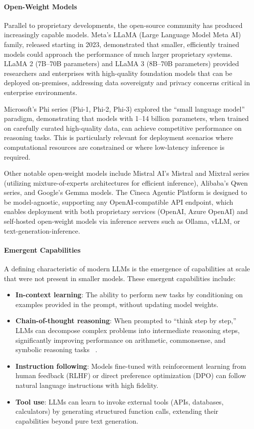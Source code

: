 \documentclass[a4paper,twoside]{sapthesis}
\begin{document}
\paragraph{Open-Weight Models}
Parallel to proprietary developments, the open-source community has produced increasingly capable models. Meta's LLaMA (Large Language Model Meta AI) family, released starting in 2023, demonstrated that smaller, efficiently trained models could approach the performance of much larger proprietary systems. LLaMA 2 (7B--70B parameters) and LLaMA 3 (8B--70B parameters) provided researchers and enterprises with high-quality foundation models that can be deployed on-premises, addressing data sovereignty and privacy concerns critical in enterprise environments.

Microsoft's Phi series (Phi-1, Phi-2, Phi-3) explored the ``small language model'' paradigm, demonstrating that models with 1--14 billion parameters, when trained on carefully curated high-quality data, can achieve competitive performance on reasoning tasks. This is particularly relevant for deployment scenarios where computational resources are constrained or where low-latency inference is required.

Other notable open-weight models include Mistral AI's Mistral and Mixtral series (utilizing mixture-of-experts architectures for efficient inference), Alibaba's Qwen series, and Google's Gemma models. The Cineca Agentic Platform is designed to be model-agnostic, supporting any OpenAI-compatible API endpoint, which enables deployment with both proprietary services (OpenAI, Azure OpenAI) and self-hosted open-weight models via inference servers such as Ollama, vLLM, or text-generation-inference.

\paragraph{Emergent Capabilities}
A defining characteristic of modern LLMs is the emergence of capabilities at scale that were not present in smaller models. These emergent capabilities include:

\begin{itemize}
    \item \textbf{In-context learning}: The ability to perform new tasks by conditioning on examples provided in the prompt, without updating model weights.
    \item \textbf{Chain-of-thought reasoning}: When prompted to ``think step by step,'' LLMs can decompose complex problems into intermediate reasoning steps, significantly improving performance on arithmetic, commonsense, and symbolic reasoning tasks~\cite{wei2022chain}
    .
    \item \textbf{Instruction following}: Models fine-tuned with reinforcement learning from human feedback (RLHF) or direct preference optimization (DPO) can follow natural language instructions with high fidelity.
    \item \textbf{Tool use}: LLMs can learn to invoke external tools (APIs, databases, calculators) by generating structured function calls, extending their capabilities beyond pure text generation.
\end{itemize}
\end{document}
